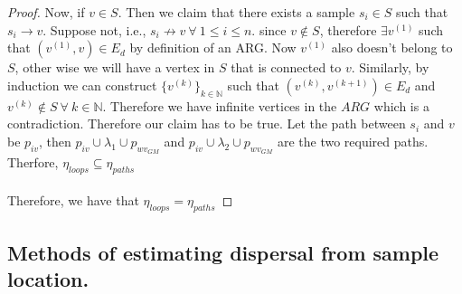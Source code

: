 \begin{proof}
Now, if $v \in S$. Then we claim that there exists a sample $s_i \in S$ such that $s_i \rightarrow v$. Suppose not, i.e., $s_i \nrightarrow v \ \forall \ 1 \leq i \leq n $. since $v \notin S$, therefore $\exists v^{(1)}$ such that $(v^{(1)},v) \in E_d$ by definition of an ARG. Now $v^{(1)}$ also doesn't belong to $S$, other wise we will have a vertex in $S$ that is connected to $v$. Similarly, by induction we can construct $\{ v^{(k)} \}_{k \in \mathbb{N}}$ such that $(v^{(k)},v^{(k+1)}) \in E_d$ and $v^{(k)} \notin S \ \forall \ k \in \mathbb{N}$.  Therefore we have infinite vertices in the $ARG$ which is a contradiction. Therefore our claim has to be true. Let the path between $s_i$ and $v$ be $p_{iv}$, then $p_{iv} \cup \lambda_1 \cup p_{wv_{GM}}$ and $p_{iv} \cup \lambda_2 \cup p_{wv_{GM}}$ are the two required paths. Therfore, $\eta_{loops} \subseteq \eta_{paths}$ \\ \\ 
Therefore, we have that $\eta_{loops} = \eta_{paths}$ 
\end{proof}

\subsection{Methods of estimating dispersal from sample location.}

